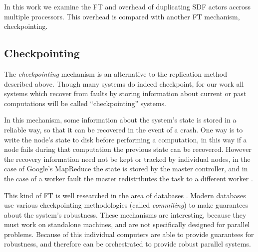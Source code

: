 In this work we examine the FT and overhead of duplicating SDF actors accross multiple processors.
This overhead is compared with another FT mechanism, checkpointing.

\subsection{Checkpointing}
The {\em checkpointing} mechanism is an alternative to the replication method described above.
Though many systems do indeed checkpoint, for our work all systems which recover from faults by storing information about current or past computations will be called ``checkpointing'' systems.

In this mechanism, some information about the system's state is stored in a reliable way, so that it can be recovered in the event of a crash.
One way is to write the node's state to disk before performing a computation, in this way if a node fails during that computation the previous state can be recovered.
However the recovery information need not be kept or tracked by individual nodes, in the case of Google's MapReduce the state is stored by the master controller, and in the case of a worker fault the master redistributes the task to a different worker \cite{dea08}.

This kind of FT is well researched in the area of databases \cite{cheese}. %
Modern databases use various checkpointing methodologies (called {\em commiting}) to make guarantees about the system's robustness.
These mechanisms are interesting, because they must work on standalone machines, and are not specifically designed for parallel problems.
Because of this individual computers are able to provide guarantees for robustness, and therefore can be orchestrated to provide robust parallel systems.